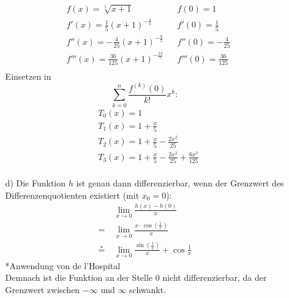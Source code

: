 \documentclass[a4paper,11pt]{article}
\begin{document}
\begin{enumerate}
\begin{enumerate}
                    \begin{align*}
                    &f(x) = \sqrt[5]{x+1} && f(0) = 1 \\
                    &f'(x) = \frac{1}{5}(x+1)^{-\frac{4}{5}} && f'(0) = \frac{1}{5} \\
                    &f''(x) = -\frac{4}{25}(x+1)^{-\frac{9}{5}} && f''(0) = -\frac{4}{25} \\
                    &f'''(x) = \frac{36}{125}(x+1)^{-\frac{14}{5}} && f'''(0) = \frac{36}{125} \\
                    \end{align*}
                    Einsetzen in $$\sum_{k=0}^{n} \frac{f^{(k)}(0)}{k!}x^k:$$ 
                    \begin{align*}
                    &T_0(x) = 1 \\
                    &T_1(x) = 1 + \frac{x}{5} \\
                    &T_2(x) = 1 + \frac{x}{5} -\frac{2x^2}{25} \\
                    &T_3(x) = 1 + \frac{x}{5} -\frac{2x^2}{25} + \frac{6x^3}{125} \\
                    \end{align*}
                \item[d)]
                    Die Funktion $h$ ist genau dann differenzierbar, wenn der Grenzwert des Differenzenquotienten existiert (mit $x_0=0$):
                    \begin{align*}
                        &\underset{x \to 0}{\lim} \frac{h(x)-h(0)}{x}\\
                        =\ &\underset{x \to 0}{\lim} \frac{x \cdot \cos(\frac{1}{x})}{x}\\
                        \overset{*}{=}\ &\underset{x \to 0}{\lim} \frac{\sin(\frac{1}{x})}{x} + \cos{\frac{1}{x}}
                    \end{align*}
                    *Anwendung von de l'Hospital\\
                    Demnach ist die Funktion an der Stelle 0 nicht differenzierbar, da der Grenzwert zwischen $-\infty$ und $\infty$ schwankt.
            \end{enumerate}


\end{enumerate}
\end{document}
